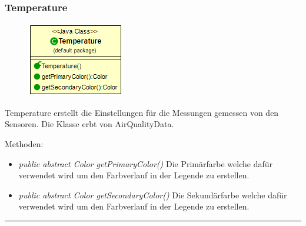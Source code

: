 \subsubsection{Temperature}
\begin{minipage}{0.3\textwidth}
    \begin{figure}[H]
        {\centering\includegraphics[scale = 0.6
        ]{media/view/airquality/Temperature_Class.png}}
    \end{figure}
    \end{minipage} \hfill
    \begin{minipage}{0.6\textwidth}
Temperature erstellt die Einstellungen für die Messungen gemessen von den Sensoren. Die Klasse erbt von AirQualityData.
\end{minipage}
\vspace{\baselineskip}
Methoden: \begin{itemize} [noitemsep]
	\item \emph{public abstract Color getPrimaryColor()} Die Primärfarbe welche dafür verwendet wird um den Farbverlauf in der Legende zu erstellen.
	\item \emph{public abstract Color getSecondaryColor()} Die Sekundärfarbe welche dafür verwendet wird um den Farbverlauf in der Legende zu erstellen.
\end{itemize}

\rule{\textwidth}{0.4pt}
